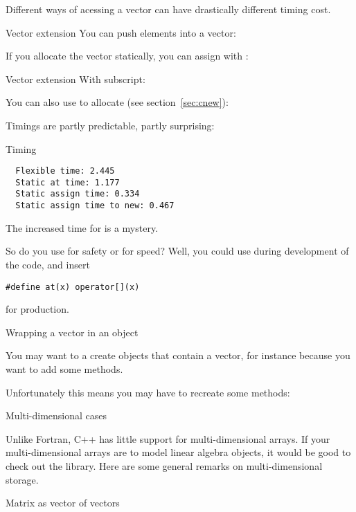 Different ways of acessing a vector can have drastically different
timing cost.

\begin{block}{Vector extension}
  \label{sl:vect-extend-code}
  You can push elements into a vector:

  If you allocate the vector statically, you can assign with :
\end{block}

\begin{block}{Vector extension}
  \label{sl:vect-extend-code2}
  With subscript:

  You can also use  to allocate (see section~\ref{sec:cnew}):
\end{block}

Timings are partly predictable, partly surprising:
\begin{block}{Timing}
  \label{sl:vector-extend-time}
\begin{lstlisting}
  Flexible time: 2.445
  Static at time: 1.177
  Static assign time: 0.334
  Static assign time to new: 0.467
\end{lstlisting}
\end{block}

The increased time for  is a mystery.

So do you use  for safety or \n{[]} for speed? Well, you could
use  during development of the code, and insert
\begin{lstlisting}
#define at(x) operator[](x)
\end{lstlisting}
for production.

 {Wrapping a vector in an object}

You may want to a create objects that contain a vector, for instance
because you want to add some methods.
%

Unfortunately this means you may have to recreate some methods:
%

 {Multi-dimensional cases}

Unlike Fortran, C++ has little support for multi-dimensional
arrays. If your multi-dimensional arrays are to model linear algebra
objects, it would be good to check out the 
library. Here are some general remarks on multi-dimensional storage.

 {Matrix as vector of vectors}

